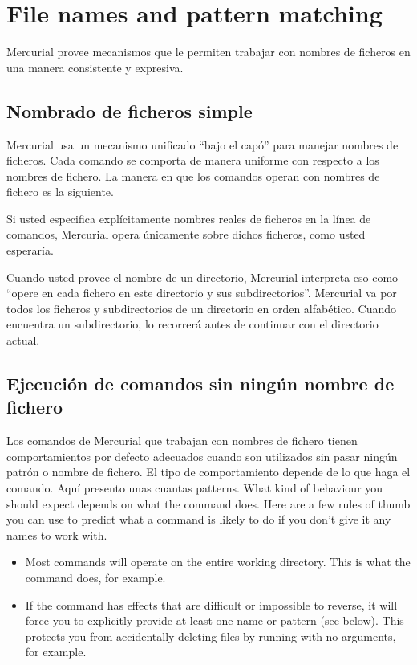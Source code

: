 \chapter{File names and pattern matching}
\label{chap:names}

Mercurial provee mecanismos que le permiten trabajar con nombres de
ficheros en una manera consistente y expresiva.

\section{Nombrado de ficheros simple}

Mercurial usa un mecanismo unificado ``bajo el capó'' para manejar
nombres de ficheros. Cada comando se comporta de manera uniforme con
respecto a los nombres de fichero. La manera en que los comandos
operan con nombres de fichero es la siguiente.

Si usted especifica explícitamente nombres reales de ficheros en la
línea de comandos, Mercurial opera únicamente sobre dichos ficheros,
como usted esperaría.

Cuando usted provee el nombre de un directorio, Mercurial interpreta
eso como ``opere en cada fichero en este directorio y sus
subdirectorios''. Mercurial va por todos los ficheros y subdirectorios
de un directorio en orden alfabético. Cuando encuentra un
subdirectorio, lo recorrerá antes de continuar con el directorio
actual.

\section{Ejecución de comandos sin ningún nombre de fichero}

Los comandos de Mercurial que trabajan con nombres de fichero tienen
comportamientos por defecto adecuados cuando son utilizados sin pasar
ningún patrón o nombre de fichero. El tipo de comportamiento depende
de lo que haga el comando. Aquí presento unas cuantas 
patterns.  What kind of behaviour you should expect depends on what
the command does.  Here are a few rules of thumb you can use to
predict what a command is likely to do if you don't give it any names
to work with.
\begin{itemize}
\item Most commands will operate on the entire working directory.
  This is what the  command does, for example.
\item If the command has effects that are difficult or impossible to
  reverse, it will force you to explicitly provide at least one name
  or pattern (see below).  This protects you from accidentally
  deleting files by running  with no arguments, for
  example.
\end{itemize}

